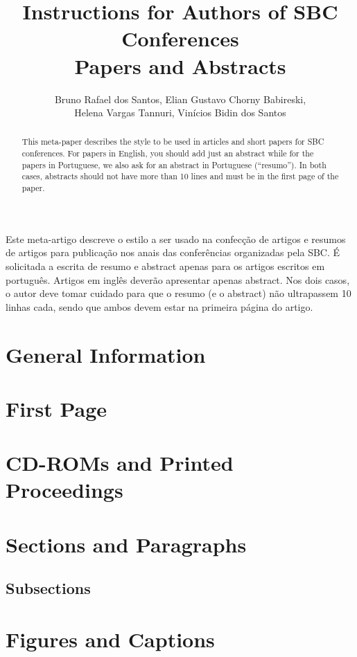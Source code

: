 \documentclass[12pt]{article}
\title{Instructions for Authors of SBC Conferences\\ Papers and Abstracts}
\author{Bruno Rafael dos Santos\inst{1}, Elian Gustavo Chorny Babireski\inst{1},\\Helena Vargas Tannuri\inst{1}, Vinícios Bidin dos Santos\inst{1}}
\begin{document}
 

\maketitle

\begin{abstract}
  This meta-paper describes the style to be used in articles and short papers
  for SBC conferences. For papers in English, you should add just an abstract
  while for the papers in Portuguese, we also ask for an abstract in
  Portuguese (``resumo''). In both cases, abstracts should not have more than
  10 lines and must be in the first page of the paper.
\end{abstract}
     
\begin{resumo} 
  Este meta-artigo descreve o estilo a ser usado na confecção de artigos e
  resumos de artigos para publicação nos anais das conferências organizadas
  pela SBC\@. É solicitada a escrita de resumo e abstract apenas para os artigos
  escritos em português. Artigos em inglês deverão apresentar apenas abstract.
  Nos dois casos, o autor deve tomar cuidado para que o resumo (e o abstract)
  não ultrapassem 10 linhas cada, sendo que ambos devem estar na primeira
  página do artigo.
\end{resumo}


\section{General Information}


\section{First Page} \label{sec:firstpage}


\section{CD-ROMs and Printed Proceedings}


\section{Sections and Paragraphs}

\subsection{Subsections}


\section{Figures and Captions}\label{sec:figs}
\end{document}
